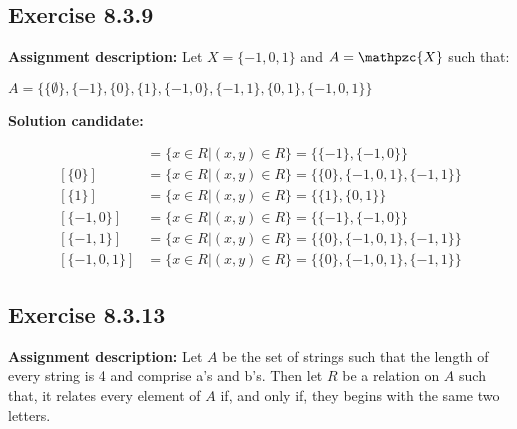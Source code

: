 \documentclass{report}
\newcommand{\cent}[1]{\begin{center}#1\end{center}}
\newcommand{\mAlign}[1]{\begin{align*}#1\end{align*}}
\newcommand{\In}{\! \in \!}
\newcommand{\script}[1]{\mathpzc{#1}}
\newcommand{\assignmentDescription}{\textbf{Assignment description: }}
\newcommand{\solution}{\textbf{Solution candidate: }}
\newcommand{\Exercise}[1]{\subsection{Exercise #1}}
\begin{document}
	\Exercise{8.3.9}
	
	\assignmentDescription
	Let $X=\{-1,0,1\}$ and $A=\script{X}$ such that:
	
	\cent{$A  = \{\{\emptyset\},\{-1\},\{0\},\{1\},\{-1,0\},\{-1,1\},\{0,1\},\{-1,0,1\}\}$}
	
	\solution
	
	\mAlign{[\{-1\}] &= \{x \in R | (x,y) \In R\} = \{\{-1\},\{-1,0\}\} \\
		[\{0\}] &= \{x \in R | (x,y) \In R\} = \{\{0\},\{-1,0,1\},\{-1,1\}\} \\
		[\{1\}] &= \{x \in R | (x,y) \In R\} = \{\{1\},\{0,1\}\} \\
		[\{-1,0\}] &= \{x \in R | (x,y) \In R\} = \{\{-1\},\{-1,0\}\} \\
		[\{-1,1\}] &= \{x \in R | (x,y) \In R\} = \{\{0\},\{-1,0,1\},\{-1,1\}\} \\
		[\{-1,0,1\}] &= \{x \in R | (x,y) \In R\} = \{\{0\},\{-1,0,1\},\{-1,1\}\}}
	
	\Exercise{8.3.13}
	
	\assignmentDescription
	Let $A$ be the set of strings such that the length of every string is 4 and comprise a's and b's. Then let $R$ be a relation on $A$ such that, it relates every element of $A$ if, and only if, they begins with the same two letters.\\
	
\end{document}
